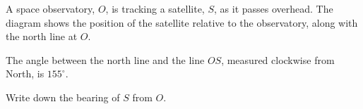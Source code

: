 \begin{question}
\noindent A space observatory, $O$, is tracking a satellite, $S$, as it passes overhead.
The diagram shows the position of the satellite relative to the observatory, along with the north line at $O$.

\begin{center}
\end{center}

\noindent The angle between the north line and the line $OS$, measured clockwise from North, is $155^\circ$.

\noindent Write down the bearing of $S$ from $O$.
\vspace{4cm}
\begin{flushright}
\end{flushright}
\end{question}